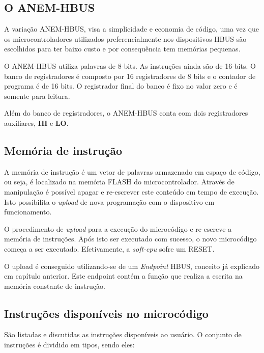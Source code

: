 
\subsection{O ANEM-HBUS}

A variação ANEM-HBUS, visa a simplicidade e economia de código, uma vez que os microcontroladores utilizados preferencialmente nos dispositivos HBUS são escolhidos para ter baixo custo e por consequência tem memórias pequenas.

O ANEM-HBUS utiliza palavras de 8-bits. As instruções ainda são de 16-bits. O banco de registradores é composto por 16 registradores de 8 bits e o contador de programa é de 16 bits. O registrador final do banco é fixo no valor zero e é somente para leitura.

Além do banco de registradores, o ANEM-HBUS conta com dois registradores auxiliares, \textbf{HI} e \textbf{LO}.

\subsection{Memória de instrução}

A memória de instrução é um vetor de palavras armazenado em espaço de código, ou seja, é localizado na memória FLASH do microcontrolador. Através de manipulação é possível apagar e re-escrever este conteúdo em tempo de execução. Isto possibilita o \textit{upload} de nova programação com o dispositivo em funcionamento.

O procedimento de \textit{upload} para a execução do microcódigo e re-escreve a memória de instruções. Após isto ser executado com sucesso, o novo microcódigo começa a ser executado. Efetivamente, a \textit{soft-cpu} sofre um RESET.

O upload é conseguido utilizando-se de um \textit{Endpoint} HBUS, conceito já explicado em capítulo anterior. Este endpoint contém a função que realiza a escrita na memória constante de instrução.

\subsection{Instruções disponíveis no microcódigo}

São listadas e discutidas as instruções disponíveis ao usuário. O conjunto de instruções é dividido em tipos, sendo eles:

